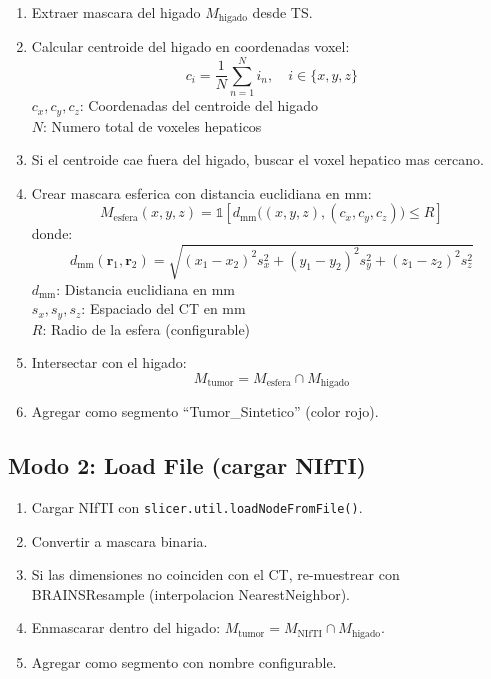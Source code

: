 \documentclass[12pt,a4paper]{article}
\newcommand{\vardef}[2]{\noindent\textbf{#1}: #2\\}
\begin{document}
\begin{enumerate}
    \item Extraer mascara del higado $M_{\text{higado}}$ desde TS.
    \item Calcular centroide del higado en coordenadas voxel:
          \begin{equation}\label{eq:centroide}
              c_i = \frac{1}{N} \sum_{n=1}^{N} i_n,\quad i \in \{x, y, z\}
          \end{equation}
          \vardef{$c_x, c_y, c_z$}{Coordenadas del centroide del higado}
          \vardef{$N$}{Numero total de voxeles hepaticos}
    \item Si el centroide cae fuera del higado, buscar el voxel hepatico mas cercano.
    \item Crear mascara esferica con distancia euclidiana en mm:
          \begin{equation}\label{eq:esfera}
              M_{\text{esfera}}(x,y,z) = \mathbb{1}\left[
              d_{\text{mm}}\big((x,y,z), (c_x,c_y,c_z)\big) \leq R
              \right]
          \end{equation}
          donde:
          \begin{equation}\label{eq:dist_mm}
              d_{\text{mm}}(\mathbf{r}_1, \mathbf{r}_2) = \sqrt{
              (x_1-x_2)^2 s_x^2 + (y_1-y_2)^2 s_y^2 + (z_1-z_2)^2 s_z^2}
          \end{equation}
          \vardef{$d_{\text{mm}}$}{Distancia euclidiana en mm}
          \vardef{$s_x, s_y, s_z$}{Espaciado del CT en mm}
          \vardef{$R$}{Radio de la esfera (configurable)}
    \item Intersectar con el higado:
          \begin{equation}\label{eq:tumor_mask}
              M_{\text{tumor}} = M_{\text{esfera}} \cap M_{\text{higado}}
          \end{equation}
    \item Agregar como segmento ``Tumor\_Sintetico'' (color rojo).
\end{enumerate}

\subsection{Modo 2: Load File (cargar NIfTI)}

\begin{enumerate}
    \item Cargar NIfTI con \texttt{slicer.util.loadNodeFromFile()}.
    \item Convertir a mascara binaria.
    \item Si las dimensiones no coinciden con el CT, re-muestrear con BRAINSResample
          (interpolacion NearestNeighbor).
    \item Enmascarar dentro del higado: $M_{\text{tumor}} = M_{\text{NIfTI}} \cap M_{\text{higado}}$.
    \item Agregar como segmento con nombre configurable.
\end{enumerate}
\end{document}
